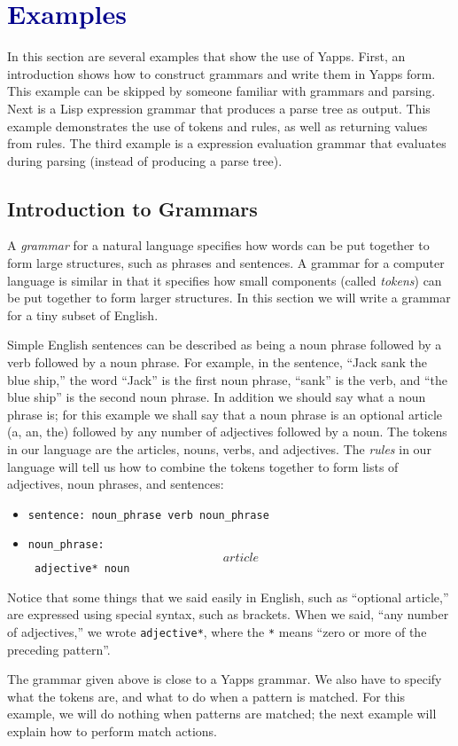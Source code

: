 \documentclass[10pt]{article}
\newcommand{\mysection}[1]{\section{\textcolor{darkblue}{#1}}}
\newcommand{\mysubsection}[1]{\subsection{\textcolor{darkerblue}{#1}}}
\begin{document}
\mysection{Examples}

In this section are several examples that show the use of Yapps.
First, an introduction shows how to construct grammars and write them
in Yapps form.  This example can be skipped by someone familiar with
grammars and parsing.  Next is a Lisp expression grammar that produces
a parse tree as output.  This example demonstrates the use of tokens
and rules, as well as returning values from rules.  The third example
is a expression evaluation grammar that evaluates during parsing
(instead of producing a parse tree).

\mysubsection{Introduction to Grammars}

A \emph{grammar} for a natural language specifies how words can be put
together to form large structures, such as phrases and sentences.  A
grammar for a computer language is similar in that it specifies how
small components (called \emph{tokens}) can be put together to form
larger structures.  In this section we will write a grammar for a tiny
subset of English.

Simple English sentences can be described as being a noun phrase
followed by a verb followed by a noun phrase.  For example, in the
sentence, ``Jack sank the blue ship,'' the word ``Jack'' is the first
noun phrase, ``sank'' is the verb, and ``the blue ship'' is the second
noun phrase.  In addition we should say what a noun phrase is; for
this example we shall say that a noun phrase is an optional article
(a, an, the) followed by any number of adjectives followed by a noun.
The tokens in our language are the articles, nouns, verbs, and
adjectives.  The \emph{rules} in our language will tell us how to
combine the tokens together to form lists of adjectives, noun phrases,
and sentences:

\begin{itemize}
  \item \texttt{sentence: noun\_phrase verb noun\_phrase}
  \item \texttt{noun\_phrase: \[article\] adjective* noun}
\end{itemize}

Notice that some things that we said easily in English, such as
``optional article,'' are expressed using special syntax, such as
brackets.  When we said, ``any number of adjectives,'' we wrote
\texttt{adjective*}, where the \texttt{*} means ``zero or more of the
preceding pattern''.

The grammar given above is close to a Yapps grammar.  We also have to
specify what the tokens are, and what to do when a pattern is matched.
For this example, we will do nothing when patterns are matched; the
next example will explain how to perform match actions.
\end{document}
